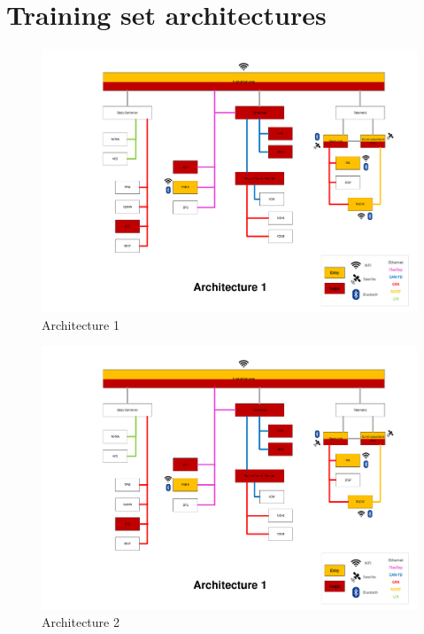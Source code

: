 \section{Training set architectures}
\begin{figure}
    \caption{Architecture 1}
    \includegraphics[width=\textwidth, page=1]{../Architectures-survey.pdf}
\end{figure}

\begin{figure}
    \caption{Architecture 2}
    \includegraphics[width=\textwidth, page=2]{../Architectures-survey.pdf}
\end{figure}

